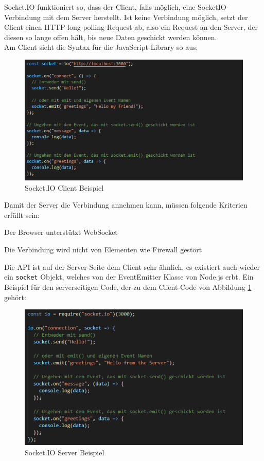 Socket.IO funktioniert so, dass der Client, falls möglich, eine SocketIO-Verbindung mit dem Server herstellt.
Ist keine Verbindung möglich, setzt der Client einen HTTP-long polling-Request ab, also ein Request an den Server, der diesen so lange offen hält, bis neue Daten geschickt werden können. \cite{httpLongPolling} \\
Am Client sieht die Syntax für die JavaScript-Library so aus:

\begin{figure}[H]
    \centering
    \includegraphics[scale=1]{pics/SocketIO_client.PNG}
    \caption{Socket.IO Client Beispiel}
    \label{tech:socketioclient}
\end{figure}

Damit der Server die Verbindung annehmen kann, müssen folgende Kriterien erfüllt sein:
\begin{compactitem}
    \item Der Browser unterstützt WebSocket
    \item Die Verbindung wird nicht von Elementen wie Firewall gestört
\end{compactitem}
Die API ist auf der Server-Seite dem Client sehr ähnlich, es existiert auch wieder ein \texttt{socket} Objekt, welches von der EventEmitter Klasse von Node.js erbt. Ein Beispiel für den serverseitigen Code, der zu dem Client-Code von Abbildung \ref{tech:socketioclient} gehört:

\begin{figure}[H]
    \centering
    \includegraphics[scale=1]{pics/SocketIO_server.PNG}
    \caption{Socket.IO Server Beispiel}
\end{figure}


